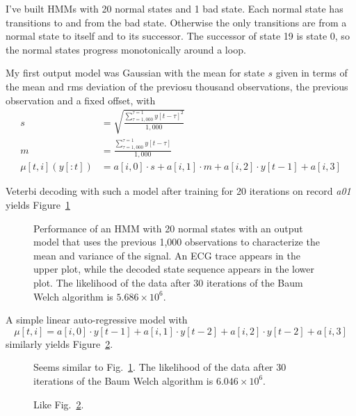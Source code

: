 \documentclass[12pt]{article}
\begin{document}
I've built HMMs with 20 normal states and 1 bad state.  Each normal
state has transitions to and from the bad state.  Otherwise the only
transitions are from a normal state to itself and to its successor.
The successor of state 19 is state 0, so the normal states progress
monotonically around a loop.

My first output model was Gaussian with the mean for state $s$ given
in terms of the mean and rms deviation of the previosu thousand
observations, the previous observation and a fixed offset, with
\begin{align*}
  s &= \sqrt{\frac{\sum_{\tau=1,000}^{\tau=1} y[t-\tau]^2}{1,000}} \\
  m &=  \frac{\sum_{\tau=1,000}^{\tau=1} y[t-\tau]}{1,000} \\
  \mu[t,i](y[:t]) &= a[i,0] \cdot s + a[i,1] \cdot m + a[i,2] \cdot
  y[t-1] + a[i,3]
\end{align*}

Veterbi decoding with such a model after training for 20 iterations on
record \emph{a01} yields Figure~\ref{fig:modelAR1k20}

\begin{figure}
  \centering
  \caption{Performance of an HMM with 20 normal states with an output
    model that uses the previous 1,000 observations to characterize
    the mean and variance of the signal.  An ECG trace appears in the
    upper plot, while the decoded state sequence appears in the lower
    plot.  The likelihood of the data after 30 iterations of the Baum
    Welch algorithm is $5.686 \times 10^{6}$.}
  \label{fig:modelAR1k20}
\end{figure}

A simple linear auto-regressive model with
\begin{equation*}
  \mu[t,i] = a[i,0] \cdot y[t-1] + a[i,1] \cdot y[t-2] + a[i,2] \cdot
  y[t-2]  + a[i,3]
\end{equation*}
similarly yields Figure~\ref{fig:modelAR3_20}.

\begin{figure}
  \centering
    \caption{Seems similar to Fig.~\ref{fig:modelAR1k20}.  The likelihood
      of the data after 30 iterations of the Baum Welch algorithm is
      $6.046 \times 10^{6}$.}
  \label{fig:modelAR3_20}
\end{figure}

\begin{figure}
  \centering
    \caption{Like Fig.~\ref{fig:modelAR3_20}.}
  \label{fig:modelAR3_300}
\end{figure}
\end{document}
